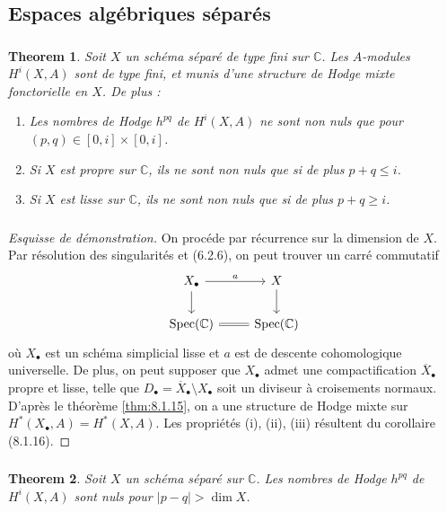 \documentclass[11pt]{amsart}
\theoremstyle{plain}
\newtheorem{theorem}{Theorem}[section]
\theoremstyle{definition}
\DeclareMathOperator{\Spec}{Spec}
\newcommand{\CC}{\mathbb{C}}
\begin{document}
\subsection{Espaces alg\'ebriques s\'epar\'es}

\subsubsection{}
\begin{theorem}
Soit $X$ un sch\'ema s\'epar\'e de type fini sur $\CC$. Les $A$-modules $H^i(X, A)$ sont de type fini, et munis d'une structure de Hodge mixte fonctorielle en $X$. De plus :
\begin{enumerate}
\item[(i)] Les nombres de Hodge $h^{pq}$ de $H^i(X, A)$ ne sont non nuls que pour $(p,q) \in [0,i] \times [0,i]$.
\item[(ii)] Si $X$ est propre sur $\CC$, ils ne sont non nuls que si de plus $p+q \leq i$.
\item[(iii)] Si $X$ est lisse sur $\CC$, ils ne sont non nuls que si de plus $p+q \geq i$.
\end{enumerate}
\end{theorem}

\subsubsection{}
\begin{proof}[Esquisse de d\'emonstration]
On proc\'ede par r\'ecurrence sur la dimension de $X$. Par r\'esolution des singularit\'es et (6.2.6), on peut trouver un carr\'e commutatif
\[
\begin{tikzcd}
X_\bullet \arrow[r, "a"] \arrow[d] & X \arrow[d] \\
\Spec(\CC) \arrow[r, equal] & \Spec(\CC)
\end{tikzcd}
\]
o\`u $X_\bullet$ est un sch\'ema simplicial lisse et $a$ est de descente cohomologique universelle. De plus, on peut supposer que $X_\bullet$ admet une compactification $\overline{X}_\bullet$ propre et lisse, telle que $D_\bullet = \overline{X}_\bullet \setminus X_\bullet$ soit un diviseur \`a croisements normaux. D'apr\`es le th\'eor\`eme \ref{thm:8.1.15}, on a une structure de Hodge mixte sur $H^*(X_\bullet, A) = H^*(X, A)$. Les propri\'et\'es (i), (ii), (iii) r\'esultent du corollaire (8.1.16).
\end{proof}

\subsubsection{}
\begin{theorem}\label{thm:8.2.4}
Soit $X$ un sch\'ema s\'epar\'e sur $\CC$. Les nombres de Hodge $h^{pq}$ de $H^i(X, A)$ sont nuls pour $|p-q| > \dim X$.
\end{theorem}
\end{document}
